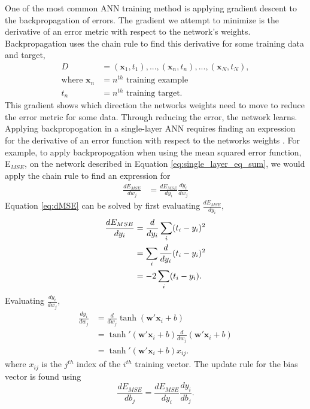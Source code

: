 One of the most common ANN training method is applying gradient descent to the backpropagation of errors. The gradient we attempt to minimize is the derivative of an error metric with respect to the network's weights. Backpropagation uses the chain rule to find this derivative for some training data and target, 
%
\begin{align} \label{eq:train_data_D}
D&={(\boldsymbol{x}_1,t_1), ... , (\boldsymbol{x}_n,t_n), ... , (\boldsymbol{x}_N,t_N)}, \\
\text{where } \boldsymbol{x}_{n} &= n^{th} \text{ training example} \nonumber \\
t_n &= n^{th} \text{ training target.} \nonumber
\end{align}
%
This gradient shows which direction the networks weights need to move to reduce the error metric for some data. Through reducing the error, the network learns. Applying backpropogation in a single-layer ANN requires finding an expression for the derivative of an error function with respect to the networks weights \cite{Nielsen2015}. For example, to apply backpropogation when using the mean squared error function, E$_{MSE}$, on the network described in Equation \ref{eq:single_layer_eq_sum}, we would apply the chain rule to find an expression for
%
\begin{align} \label{eq:dMSE}
\frac{dE_{MSE}}{dw_j} &= \frac{dE_{MSE}}{dy_i} \frac{dy_i}{dw_j}
\end{align}
%
Equation \ref{eq:dMSE} can be solved by first evaluating $\frac{dE_{MSE}}{dy_i}$,
%
\begin{align} \label{dE_{MSE}/dy_i}
\frac{dE_{MSE}}{dy_i}  &= \frac{d}{dy_i} \sum_i(t_i - y_i)^2 \\
&= \sum_i  \frac{d}{dy_i} (t_i - y_i)^2 \nonumber \\
&=  -2 \sum_i  (t_i - y_i). \nonumber
\end{align}
%
Evaluating $\frac{dy_i}{dw_j}$,
%
\begin{align} \label{dy_i/dw_i}
\frac{dy_i}{dw_j}  &= \frac{d}{dw_j} \tanh( \boldsymbol{w}' \boldsymbol{x}_i + b) \\
&= \tanh'( \boldsymbol{w}' \boldsymbol{x}_i + b) \frac{d}{dw_j}( \boldsymbol{w}' \boldsymbol{x}_i + b) \nonumber \\
&= \tanh'( \boldsymbol{w}' \boldsymbol{x}_i + b)  x_{ij}. \nonumber
\end{align}
%
\noindent where $x_{ij}$ is the $j^{th}$ index of the $i^{th}$ training vector.
%
The update rule for the bias vector is found using
%
\begin{equation} \label{eq:dE_MSE/db_j}
\frac{dE_{MSE}}{db_j} = \frac{dE_{MSE}}{dy_i} \frac{dy_i}{db_j}.
\end{equation}
